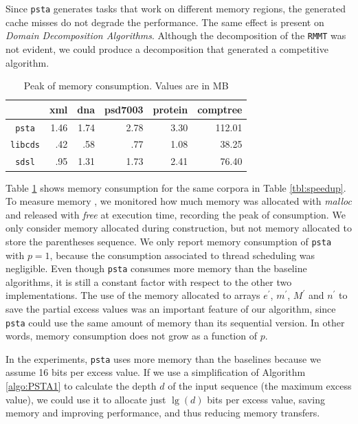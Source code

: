 Since {\tt psta} generates tasks that work on different memory
regions, the generated cache misses  do
not degrade the performance. The same effect is present on
\emph{Domain Decomposition Algorithms}. Although the decomposition of
the {\tt RMMT} was not evident, we could produce a decomposition that
generated a competitive algorithm.
	
\begin{table}[ht]
  \centering
  \begin{tabular}{crrrrr}
\hline
    & xml & dna & psd7003 & protein & comptree\\
\hline
 \verb|psta|   &  1.46  &  1.74  & 2.78  &  3.30 & 112.01\\
 \verb|libcds|   &  .42 &  .58 & .77 &  1.08 & 38.25\\
 \verb|sdsl|   &  .95 &  1.31 & 1.73 &  2.41 & 76.40\\
 \hline
\end{tabular}
\caption{Peak of memory consumption. Values are in MB}
\label{tbl:memory_consumption}
\end{table}

Table \ref{tbl:memory_consumption} shows memory consumption for the
same corpora in Table \ref{tbl:speedup}. To measure memory , we
monitored how much memory was allocated with \emph{malloc} and
released with \emph{free} at execution time, recording the peak of
consumption. We only consider memory allocated during construction,
but not memory allocated to store the parentheses sequence. We only
report memory consumption of {\tt psta} with $p=1$, because the
consumption associated to thread scheduling was negligible. Even
though {\tt psta} consumes more memory than the baseline algorithms,
it is still a constant factor with respect to the other two
implementations. The use of the memory allocated to arrays
$e^{\prime}$, $m^{\prime}$, $M^{\prime}$ and $n^{\prime}$ to save the
partial excess values was an important feature of our algorithm, since
{\tt psta} could use the same amount of memory than its sequential
version. In other words, memory consumption does not grow as a
function of $p$.

In the experiments, {\tt psta} uses more memory than the baselines
because we assume 16 bits per excess value. If we use a simplification
of Algorithm \ref{algo:PSTA1} to calculate the depth $d$ of the input
sequence (the maximum excess value), we could use it to allocate just
$\lg (d)$ bits per excess value, saving memory and improving
performance, and thus reducing memory transfers.